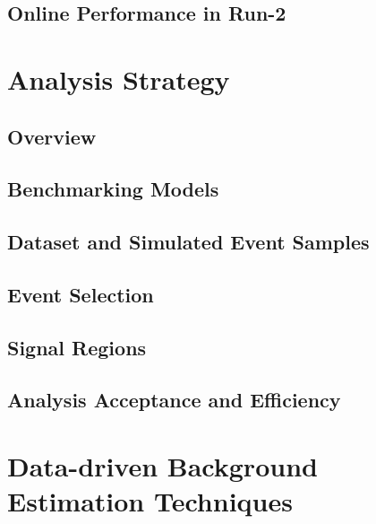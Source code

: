 \documentclass{outhesis}
\begin{document}
\section{Online Performance in Run-2}\label{sec:roib.perf}


\chapter{Analysis Strategy}\label{chap:strategy}
\graphicspath{{figures/strategy/}}
\section{Overview}\label{sec:strategy.overview}

\section{Benchmarking Models}\label{sec:strategy.pheno}

\section{Dataset and Simulated Event Samples}\label{sec:strategy.samples}

\section{Event Selection}\label{sec:strategy.sel}

\section{Signal Regions}\label{sec:strategy.sr}

\section{Analysis Acceptance and Efficiency}\label{sec:strategy.sr}


\chapter{Data-driven Background Estimation Techniques}\label{chap:fake}
\graphicspath{{figures/fake/}}
\end{document}
